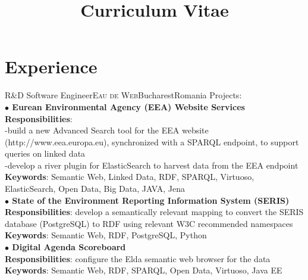 \documentclass[11pt,a4paper,sans]{moderncv}
\title{Curriculum Vitae}
\begin{document}
\makecvtitle



\section{Experience}
{R\&D Software Engineer}{\textsc{Eau de Web}}{Bucharest}{Romania}
{Projects: \\ 
\textbf{ $\bullet$ Eurean Environmental Agency (EEA) Website Services } \\ 
\textbf{Responsibilities}: \\ 
-build a new Advanced Search tool for the EEA website (http://www.eea.europa.eu), 
synchronized with a SPARQL endpoint, to support queries on linked data \\ 
-develop a river plugin for ElasticSearch to harvest data from the EEA endpoint \\
\textbf{Keywords}: Semantic Web, Linked Data, RDF, SPARQL, Virtuoso, ElasticSearch, Open Data, Big Data, JAVA, Jena \\
\textbf{ $\bullet$ State of the Environment Reporting Information System (SERIS) } \\
\textbf{Responsibilities}: develop a semantically relevant mapping to convert the SERIS database (PostgreSQL) 
to RDF using relevant W3C recommended namespaces  \\
\textbf{Keywords}: Semantic Web, RDF, PostgreSQL, Python\\ 
\textbf{ $\bullet$ Digital Agenda Scoreboard } \\ 
\textbf{Responsibilities}: configure the Elda semantic web browser for the data \\ 
\textbf{Keywords}: Semantic Web, RDF, SPARQL, Open Data, Virtuoso, Java EE }
\end{document}
